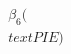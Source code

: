 \documentclass[preview]{standalone}
\begin{document}
\begin{align*}
\beta_6(\\text{PIE})
\end{align*}
\end{document}
